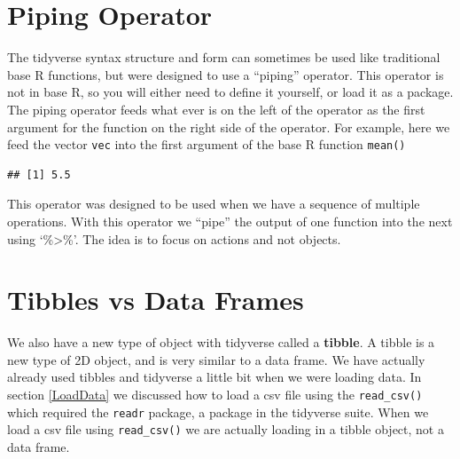 \documentclass[
]{book}
\newenvironment{Shaded}{\begin{snugshade}}{\end{snugshade}}
\newcommand{\DecValTok}[1]{\textcolor[rgb]{0.00,0.00,0.81}{#1}}
\newcommand{\KeywordTok}[1]{\textcolor[rgb]{0.13,0.29,0.53}{\textbf{#1}}}
\newcommand{\NormalTok}[1]{#1}
\newcommand{\OperatorTok}[1]{\textcolor[rgb]{0.81,0.36,0.00}{\textbf{#1}}}
\newcommand{\StringTok}[1]{\textcolor[rgb]{0.31,0.60,0.02}{#1}}
\begin{document}
\hypertarget{piping-operator}{%
\section{Piping Operator}\label{piping-operator}}

The tidyverse syntax structure and form can sometimes be used like traditional base R functions, but were designed to use a ``piping'' operator. This operator is not in base R, so you will either need to define it yourself, or load it as a package. The piping operator feeds what ever is on the left of the operator as the first argument for the function on the right side of the operator. For example, here we feed the vector \texttt{vec} into the first argument of the base R function \texttt{mean()}

\begin{Shaded}
\end{Shaded}

\begin{verbatim}
## [1] 5.5
\end{verbatim}

This operator was designed to be used when we have a sequence of multiple operations. With this operator we ``pipe'' the output of one function into the next using `\%\textgreater\%'. The idea is to focus on actions and not objects.

\hypertarget{tibbles-vs-data-frames}{%
\section{Tibbles vs Data Frames}\label{tibbles-vs-data-frames}}

We also have a new type of object with tidyverse called a \textbf{tibble}. A tibble is a new type of 2D object, and is very similar to a data frame. We have actually already used tibbles and tidyverse a little bit when we were loading data. In section \ref{LoadData} we discussed how to load a csv file using the \texttt{read\_csv()} which required the \texttt{readr} package, a package in the tidyverse suite. When we load a csv file using \texttt{read\_csv()} we are actually loading in a tibble object, not a data frame.
\end{document}
